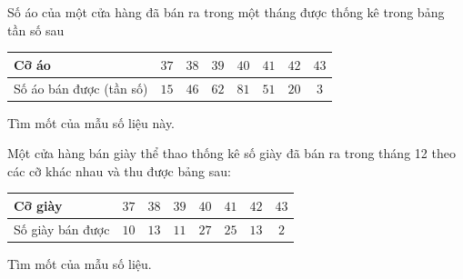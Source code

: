 \begin{bt}[N]%
	Số áo của một cửa hàng đã bán ra trong một tháng được thống kê trong bảng tần số sau
	\begin{center}
		\begin{tabular}{|l|c|c|c|c|c|c|c|}
			\hline
			Cỡ áo& $37$ & $38$ & $39$ & $40$ & $41$ & $42$ & $43$ \\
			\hline
			Số áo bán được (tần số) & $15$ & $46$ & $62$ & $81$ & $51$ & $20$ & $3$ \\
			\hline
		\end{tabular}
	\end{center}
	Tìm mốt của mẫu số liệu này.
\end{bt}

\begin{bt}[N]%
Một cửa hàng bán giày thể thao thống kê số giày đã bán ra trong tháng 12 theo các cỡ khác nhau và thu được bảng sau:
\begin{center}
\begin{tabular}{|l|c|c|c|c|c|c|c|}
	 \hline
	Cỡ giày & $37$ & $38$ & $39$ & $40$ & $41$ & $42$ & $43$ \\
	\hline
	Số giày bán được & $10$ & $13$ & $11$ & $27$ & $25$ & $13$ & $2$ \\
	\hline
\end{tabular}
\end{center}
Tìm  mốt của mẫu số liệu.
\end{bt}

